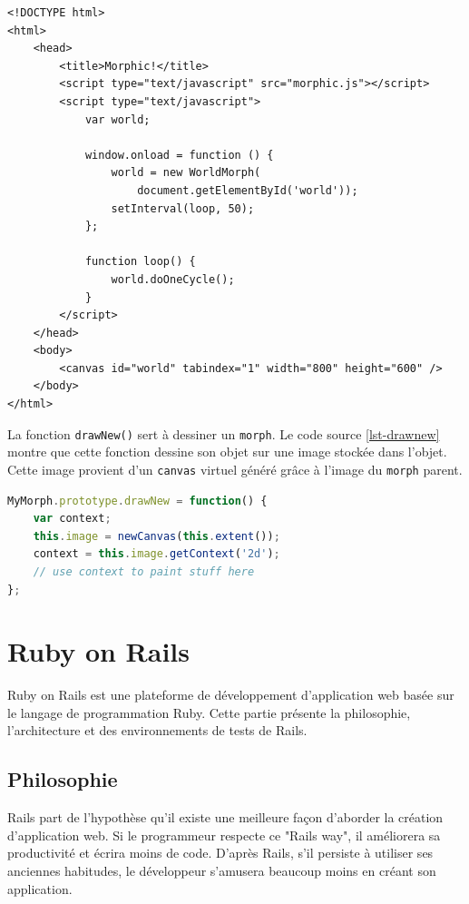 \begin{lstlisting}[caption={Exemple d'utilisation de \texttt{morphic.js}},label=lst-doonecycle,language=HTML5,alsolanguage=JavaScript]
<!DOCTYPE html>
<html>
    <head>
        <title>Morphic!</title>
        <script type="text/javascript" src="morphic.js"></script>
        <script type="text/javascript">
            var world;

            window.onload = function () {
                world = new WorldMorph(
                    document.getElementById('world'));
                setInterval(loop, 50);
            };

            function loop() {
                world.doOneCycle();
            }
        </script>
    </head>
    <body>
        <canvas id="world" tabindex="1" width="800" height="600" />
    </body>
</html>
\end{lstlisting}

La fonction \texttt{drawNew()} sert à dessiner un \texttt{morph}. Le code source \ref{lst-drawnew} montre que cette fonction dessine son objet sur une image stockée dans l'objet. Cette image provient d'un \texttt{canvas} virtuel généré grâce à l'image du \texttt{morph} parent.

\begin{lstlisting}[caption={Modèle pour la fonction \texttt{drawNew()}},label=lst-drawnew,language=JavaScript]
MyMorph.prototype.drawNew = function() {
    var context;
    this.image = newCanvas(this.extent());
    context = this.image.getContext('2d');
    // use context to paint stuff here
};
\end{lstlisting}

\section{Ruby on Rails}
\label{rails} 
Ruby on Rails est une plateforme de développement d'application web basée sur le langage de programmation Ruby. Cette partie présente la philosophie, l'architecture et des environnements de tests de Rails.

\subsection{Philosophie}
Rails part de l'hypothèse qu'il existe une meilleure façon d'aborder la création d'application web. Si le programmeur respecte ce "Rails way", il améliorera sa productivité et écrira moins de code. D'après Rails, s’il persiste à utiliser ses anciennes habitudes, le développeur s'amusera beaucoup moins en créant son application.

